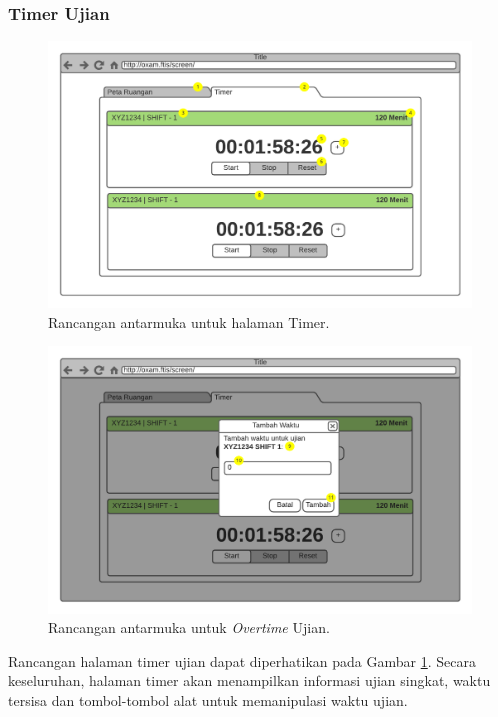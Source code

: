 \subsubsection{Timer Ujian}
    \begin{figure}
        \centering
        \includegraphics[width=0.75\paperwidth]{Gambar/mockups/Mockup--DosenPengawas - Timer.pdf}
        \caption{Rancangan antarmuka untuk halaman Timer.}
        \label{fig:mockup_dosen_timer}
    \end{figure}
    
    \begin{figure}
        \centering
        \includegraphics[width=0.75\paperwidth]{Gambar/mockups/Mockup--DosenPengawas - Timer + Overtime.pdf}
        \caption{Rancangan antarmuka untuk \textit{Overtime} Ujian.}
        \label{fig:mockup_dosen_overtime}
    \end{figure}
    
    Rancangan halaman timer ujian dapat diperhatikan pada Gambar
    \ref{fig:mockup_dosen_timer}. Secara keseluruhan, halaman timer akan
    menampilkan informasi ujian singkat, waktu tersisa dan tombol-tombol alat
    untuk memanipulasi waktu ujian.
    
